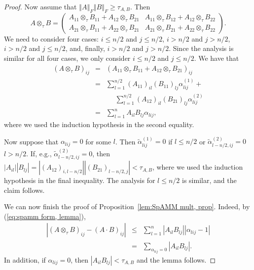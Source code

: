 \documentclass[letterpaper,twocolumn,amsmath,amsfont,amssymb,english,aps,jcp,preprintnumbers,groupaddress,nofootinbib,tightenlines,floatfix]{revtex4}
\theoremstyle{plain}
\theoremstyle{remark}
\theoremstyle{plain}
\begin{document}
\begin{proof}
Now assume that $\left\Vert A\right\Vert _{F}\left\Vert B\right\Vert _{F}\geq\tau_{A,B}$.
Then
\[
A\otimes_{\tau}B=\left(\begin{array}{cc}
A_{11}\otimes_{\tau}B_{11}+A_{12}\otimes_{\tau}B_{21} & A_{11}\otimes_{\tau}B_{12}+A_{12}\otimes_{\tau}B_{22}\\
A_{21}\otimes_{\tau}B_{11}+A_{22}\otimes_{\tau}B_{21} & A_{21}\otimes_{\tau}B_{21}+A_{22}\otimes_{\tau}B_{22}
\end{array}\right).
\]
We need to consider four cases: $i\leq n/2$ and $j\leq n/2$, $i>n/2$
and $j>n/2$, $i>n/2$ and $j\leq n/2$, and, finally, $i>n/2$ and
$j>n/2$. Since the analysis is similar for all four cases, we only
consider $i\leq n/2$ and $j\leq n/2$. We have that 
\begin{eqnarray*}
\left(A\otimes_{\tau}B\right)_{ij} & = & \left(A_{11}\otimes_{\tau}B_{11}+A_{12}\otimes_{\tau}B_{21}\right)_{ij}\\
 & = & \sum_{l=1}^{n/2}\left(A_{11}\right)_{il}\left(B_{11}\right)_{lj}\alpha_{lij}^{(1)} + \\
 & & \,\,\,\,\,\,\,\, \sum_{l=1}^{n/2}\left(A_{12}\right)_{il}\left(B_{21}\right)_{lj}\alpha_{lij}^{(2)}\\
 & = & \sum_{l=1}^{n}A_{il}B_{lj}\alpha_{lij},
\end{eqnarray*}
where we used the induction hypothesis in the second equality.

Now suppose that $\alpha_{lij}=0$ for some $l$. Then $\tilde{\alpha}_{lij}^{(1)}=0$
if $l\leq n/2$ or $\tilde{\alpha}_{l-n/2,ij}^{(2)}=0$ $l>n/2$.
If, e.g., $\tilde{\alpha}_{l-n/2,ij}^{(2)}=0$, then $\left|A_{il}\right|\left|B_{lj}\right|=\left|\left(A_{12}\right)_{i,l-n/2}\right|\left|\left(B_{21}\right)_{l-n/2,j}\right|<\tau_{A,B}$,
where we used the induction hypothesis in the final inequality. The
analysis for $l\leq n/2$ is similar, and the claim
follows.

We can now finish the proof of Proposition~\ref{lem:SpAMM mult, prop}. Indeed, by (\ref{eq:spamm form, lemma}),
\begin{eqnarray*}
\left|\left(A\otimes_{\tau}B\right)_{ij}-\left(A\cdot B\right)_{ij}\right| & \leq & \sum_{l=1}^{n}\left|A_{il}B_{lj}\right|\left|\alpha_{lij}-1\right|\\
 & = & \sum_{\alpha_{lij}=0}\left|A_{il}B_{lj}\right|.
\end{eqnarray*}
In addition, if $\alpha_{lij}=0$, then $\left|A_{il}B_{lj}\right|<\tau_{A,B}$
and the lemma follows.


\end{proof}
\end{document}
